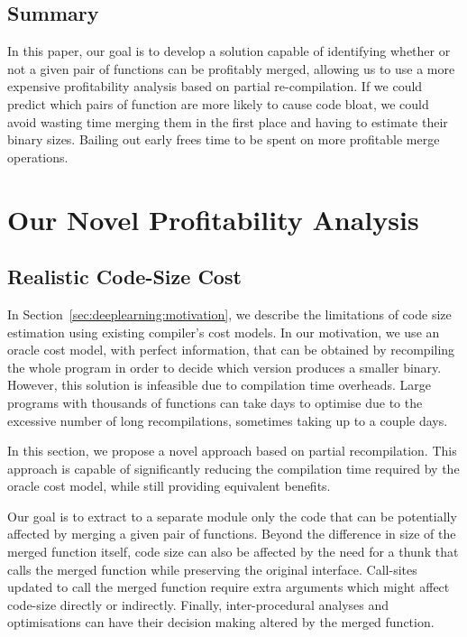 

\subsection{Summary}

In this paper, our goal is to develop a solution capable of identifying whether or not a given pair of functions can be profitably merged, allowing us to use a more expensive profitability analysis based on partial re-compilation.
If we could predict which pairs of function are more likely to cause code bloat, we could avoid wasting time merging them in the first place and having to estimate their binary sizes.
Bailing out early frees time to be spent on more profitable merge operations.

\section{Our Novel Profitability Analysis}

\subsection{Realistic Code-Size Cost}

In Section~\ref{sec:deeplearning:motivation}, we describe the limitations of code size estimation using existing compiler's cost models.
In our motivation, we use an oracle cost model, with perfect information, that can be obtained by recompiling the whole program in order to decide which version produces a smaller binary.
However, this solution is infeasible due to compilation time overheads.
Large programs with thousands of functions can take days to optimise due to the excessive number of long recompilations, sometimes taking up to a couple days.

In this section, we propose a novel approach based on partial recompilation.
This approach is capable of significantly reducing the compilation time required by the oracle cost model, while still providing equivalent benefits.

Our goal is to extract to a separate module only the code that can be potentially affected by merging a given pair of functions.
Beyond the difference in size of the merged function itself, code size can also be affected by the need for a thunk that calls the merged function while preserving the original interface.
Call-sites updated to call the merged function require extra arguments which might affect code-size directly or indirectly. %
Finally, inter-procedural analyses and optimisations can have their decision making altered by the merged function.

